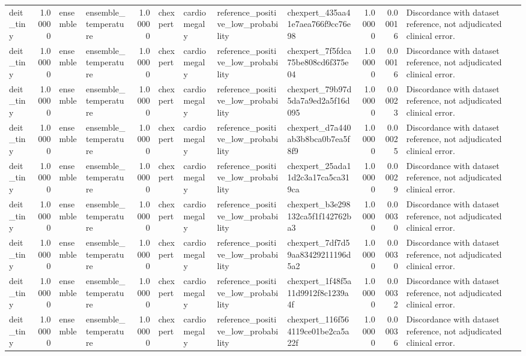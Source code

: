 \begin{tabular}{lrllrllllrrl}
deit\_tiny & 1.00000 & ensemble & ensemble\_temperature & 1.00000 & chexpert & cardiomegaly & reference\_positive\_low\_probability & chexpert\_435aa41e7aea766f9cc76e98 & 1.00000 & 0.00016 & Discordance with dataset reference, not adjudicated clinical error. \\
deit\_tiny & 1.00000 & ensemble & ensemble\_temperature & 1.00000 & chexpert & cardiomegaly & reference\_positive\_low\_probability & chexpert\_7f5fdca75be808cd6f375e04 & 1.00000 & 0.00016 & Discordance with dataset reference, not adjudicated clinical error. \\
deit\_tiny & 1.00000 & ensemble & ensemble\_temperature & 1.00000 & chexpert & cardiomegaly & reference\_positive\_low\_probability & chexpert\_79b97d5da7a9ed2a5f16d095 & 1.00000 & 0.00023 & Discordance with dataset reference, not adjudicated clinical error. \\
deit\_tiny & 1.00000 & ensemble & ensemble\_temperature & 1.00000 & chexpert & cardiomegaly & reference\_positive\_low\_probability & chexpert\_d7a440ab3b8bca0b7ea5f8f9 & 1.00000 & 0.00025 & Discordance with dataset reference, not adjudicated clinical error. \\
deit\_tiny & 1.00000 & ensemble & ensemble\_temperature & 1.00000 & chexpert & cardiomegaly & reference\_positive\_low\_probability & chexpert\_25ada11d2c3a17ca5ca319ca & 1.00000 & 0.00029 & Discordance with dataset reference, not adjudicated clinical error. \\
deit\_tiny & 1.00000 & ensemble & ensemble\_temperature & 1.00000 & chexpert & cardiomegaly & reference\_positive\_low\_probability & chexpert\_b3e298132ca5f1f142762ba3 & 1.00000 & 0.00030 & Discordance with dataset reference, not adjudicated clinical error. \\
deit\_tiny & 1.00000 & ensemble & ensemble\_temperature & 1.00000 & chexpert & cardiomegaly & reference\_positive\_low\_probability & chexpert\_7df7d59aa83429211196d5a2 & 1.00000 & 0.00030 & Discordance with dataset reference, not adjudicated clinical error. \\
deit\_tiny & 1.00000 & ensemble & ensemble\_temperature & 1.00000 & chexpert & cardiomegaly & reference\_positive\_low\_probability & chexpert\_1f48f5a11d9912f8c1239a4f & 1.00000 & 0.00032 & Discordance with dataset reference, not adjudicated clinical error. \\
deit\_tiny & 1.00000 & ensemble & ensemble\_temperature & 1.00000 & chexpert & cardiomegaly & reference\_positive\_low\_probability & chexpert\_116f564119ce01be2ca5a22f & 1.00000 & 0.00036 & Discordance with dataset reference, not adjudicated clinical error. \\

\end{tabular}
